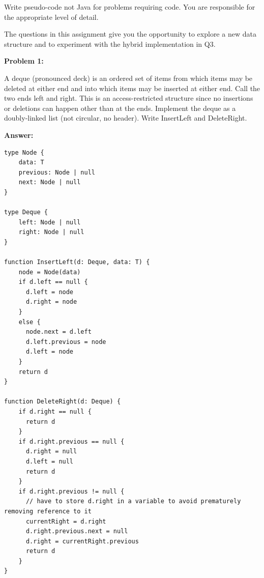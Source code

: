 \documentclass[10pt,letterpaper,final]{report}
\begin{document}
\begin{center}
  \vline
\end{center}

Write pseudo-code not Java for problems requiring code. You are responsible for the appropriate level of detail.

The questions in this assignment give you the opportunity to explore a new data structure and to experiment with the hybrid implementation in Q3.

\medskip

\noindent\textbf{Problem 1:}

A deque (pronounced deck) is an ordered set of items from which items may be deleted at either end and into which items may be inserted at either end. Call the two ends left and right. This is an access-restricted structure since no insertions or deletions can happen other than at the ends. Implement the deque as a doubly-linked list (not circular, no header). Write InsertLeft and DeleteRight.

\medskip
\noindent\textbf{Answer:}
\medskip

\begin{verbatim}
type Node {
    data: T
    previous: Node | null
    next: Node | null
}

type Deque {
    left: Node | null
    right: Node | null
}

function InsertLeft(d: Deque, data: T) {
    node = Node(data)
    if d.left == null {
      d.left = node
      d.right = node
    }
    else {
      node.next = d.left
      d.left.previous = node
      d.left = node
    }
    return d
}

function DeleteRight(d: Deque) {
    if d.right == null {
      return d
    }
    if d.right.previous == null {
      d.right = null
      d.left = null
      return d
    }
    if d.right.previous != null {
      // have to store d.right in a variable to avoid prematurely removing reference to it  
      currentRight = d.right
      d.right.previous.next = null
      d.right = currentRight.previous
      return d
    }
}
\end{verbatim}
\end{document}
